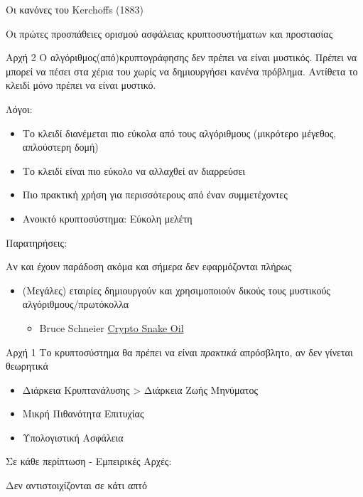 \documentclass[handout]{beamer}
\begin{document}
\begin{frame}[allowframebreaks]{Οι κανόνες του Kerchoffs (1883)}

Οι πρώτες προσπάθειες ορισμού ασφάλειας κρυπτοσυστήματων και προστασίας 

\begin{block}{Αρχή 2}
Ο αλγόριθμος(από)κρυπτογράφησης δεν πρέπει να είναι μυστικός. Πρέπει να μπορεί να πέσει στα χέρια του \adv χωρίς να δημιουργήσει κανένα πρόβλημα. Αντίθετα το κλειδί μόνο πρέπει να είναι μυστικό.
\end{block}

Λόγοι:
\pause 

\begin{itemize}
\item Tο κλειδί διανέμεται πιο εύκολα από τους αλγόριθμους (μικρότερο μέγεθος, απλούστερη δομή)  
\item Το κλειδί είναι πιο εύκολο να αλλαχθεί αν διαρρεύσει
\item Πιο πρακτική χρήση για περισσότερους από έναν συμμετέχοντες
\item Ανοικτό κρυπτοσύστημα: Εύκολη μελέτη 
\end{itemize}

Παρατηρήσεις:

Αν και έχουν παράδοση ακόμα και σήμερα δεν εφαρμόζονται πλήρως
\begin{itemize}
\item (Μεγάλες) εταιρίες δημιουργούν και χρησιμοποιούν δικούς τους μυστικούς αλγόριθμους/πρωτόκολλα
\begin{itemize}
\item Bruce Schneier \href{https://goo.gl/FaFoSK}{Crypto Snake Oil}
\end{itemize}

\end{itemize}
 

\framebreak
\begin{block}{Αρχή 1}
Το κρυπτοσύστημα θα πρέπει να είναι \emph{πρακτικά} απρόσβλητο, αν δεν γίνεται θεωρητικά
\end{block}
\begin{itemize}
\item Διάρκεια Κρυπτανάλυσης > Διάρκεια Ζωής Μηνύματος
\item Μικρή Πιθανότητα Επιτυχίας
\item Υπολογιστική Ασφάλεια
\end{itemize}
\pause 

Σε κάθε περίπτωση - Εμπειρικές Αρχές: 

Δεν αντιστοιχίζονται σε κάτι απτό
\end{frame}
\end{document}
